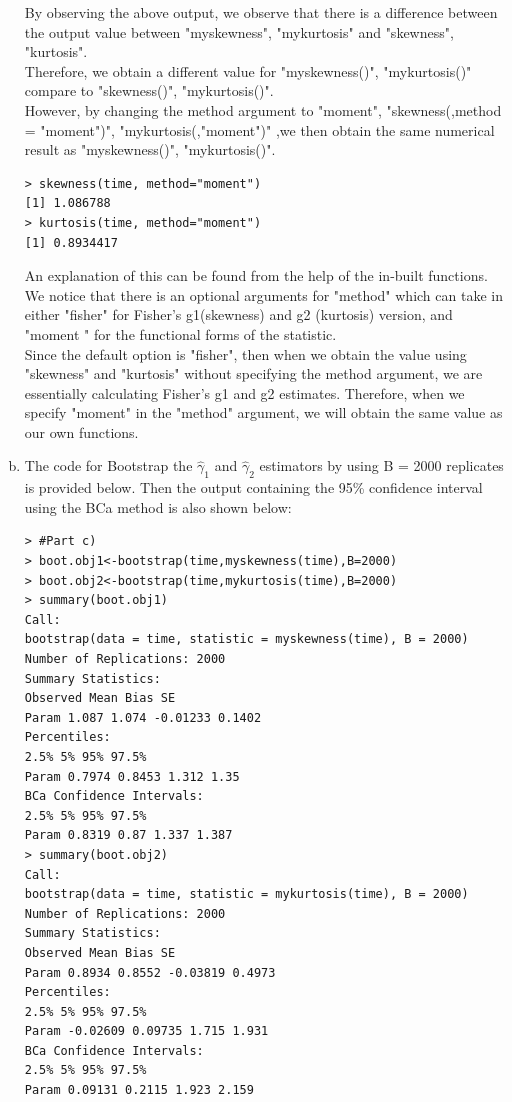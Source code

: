 \documentclass[a4paper,11pt]{article}
\begin{document}
\begin{enumerate}[(a)]
\begin{verbatim}
\end{verbatim}
By observing the above output, we observe that there is a difference between the output value between "myskewness", "mykurtosis" and "skewness", "kurtosis".\\
Therefore, we obtain a different value for "myskewness()", "mykurtosis()" compare to "skewness()", "mykurtosis()".\\
However, by changing the method argument to "moment", "skewness(,method = "moment")", "mykurtosis(,"moment")" ,we then obtain the same numerical result as "myskewness()", "mykurtosis()".
\begin{verbatim}
> skewness(time, method="moment")
[1] 1.086788
> kurtosis(time, method="moment")
[1] 0.8934417
\end{verbatim} 
An explanation of this can be found from the help of the in-built functions. We notice that there is an optional arguments for "method" which can take in either "fisher" for Fisher's g1(skewness) and g2 (kurtosis) version, and "moment " for the functional forms of the statistic.\\
Since the default option is "fisher", then when we obtain the value using "skewness" and "kurtosis" without specifying the method argument, we are essentially calculating Fisher's g1 and g2 estimates. Therefore, when we specify "moment" in the "method" argument, we will obtain the same value as our own functions.
\item
The code for Bootstrap the $\hat{\gamma}_1$ and $\hat{\gamma}_2$ estimators by using B = 2000 replicates is provided below. Then the output containing the 95\% confidence interval using the BCa method is also shown below:
\begin{verbatim}
> #Part c)
> boot.obj1<-bootstrap(time,myskewness(time),B=2000)
> boot.obj2<-bootstrap(time,mykurtosis(time),B=2000)
> summary(boot.obj1)
Call:
bootstrap(data = time, statistic = myskewness(time), B = 2000)
Number of Replications: 2000
Summary Statistics:
Observed Mean Bias SE 
Param 1.087 1.074 -0.01233 0.1402
Percentiles:
2.5% 5% 95% 97.5% 
Param 0.7974 0.8453 1.312 1.35
BCa Confidence Intervals:
2.5% 5% 95% 97.5% 
Param 0.8319 0.87 1.337 1.387
> summary(boot.obj2)
Call:
bootstrap(data = time, statistic = mykurtosis(time), B = 2000)
Number of Replications: 2000
Summary Statistics:
Observed Mean Bias SE 
Param 0.8934 0.8552 -0.03819 0.4973
Percentiles:
2.5% 5% 95% 97.5% 
Param -0.02609 0.09735 1.715 1.931
BCa Confidence Intervals:
2.5% 5% 95% 97.5% 
Param 0.09131 0.2115 1.923 2.159
\end{verbatim}

\end{enumerate}
\end{document}
